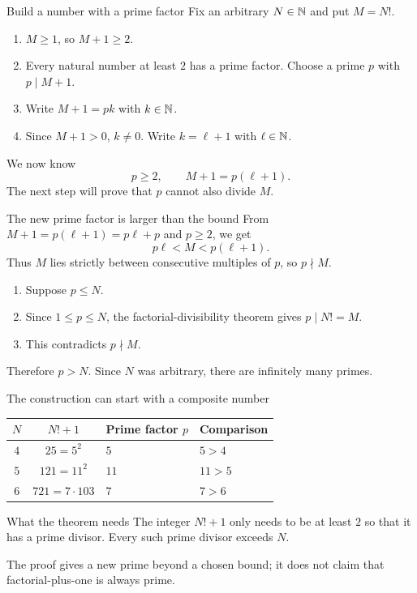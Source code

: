 \begin{frame}{Build a number with a prime factor}
Fix an arbitrary $N\in\mathbb{N}$ and put $M=N!$.
\begin{enumerate}
\item $M\ge1$, so $M+1\ge2$.
\item Every natural number at least $2$ has a prime factor. Choose a prime $p$ with $p\mid M+1$.
\item Write $M+1=pk$ with $k\in\mathbb{N}$.
\item Since $M+1>0$, $k\ne0$. Write $k=\ell+1$ with $\ell\in\mathbb{N}$.
\end{enumerate}
We now know
\[
p\ge2,\qquad M+1=p(\ell+1).
\]
The next step will prove that $p$ cannot also divide $M$.
\end{frame}

\begin{frame}{The new prime factor is larger than the bound}
From $M+1=p(\ell+1)=p\ell+p$ and $p\ge2$, we get
\[
p\ell<M<p(\ell+1).
\]
Thus $M$ lies strictly between consecutive multiples of $p$, so $p\nmid M$.
\begin{enumerate}
\item Suppose $p\le N$.
\item Since $1\le p\le N$, the factorial-divisibility theorem gives $p\mid N!=M$.
\item This contradicts $p\nmid M$.
\end{enumerate}
Therefore $p>N$. Since $N$ was arbitrary, there are infinitely many primes.
\end{frame}

\begin{frame}{The construction can start with a composite number}
\begin{center}
\begin{tabular}{ccll}
\toprule
$N$ & $N!+1$ & Prime factor $p$ & Comparison\\\midrule
$4$ & $25=5^2$ & $5$ & $5>4$\\[2mm]
$5$ & $121=11^2$ & $11$ & $11>5$\\[2mm]
$6$ & $721=7\cdot103$ & $7$ & $7>6$\\\bottomrule
\end{tabular}
\end{center}
\begin{block}{What the theorem needs}
The integer $N!+1$ only needs to be at least $2$ so that it has a prime divisor. Every such prime divisor exceeds $N$.
\end{block}
The proof gives a new prime beyond a chosen bound; it does not claim that factorial-plus-one is always prime.
\end{frame}

